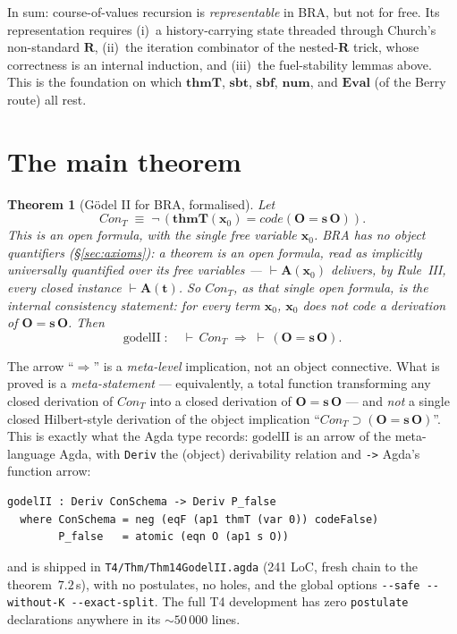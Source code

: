 \documentclass[11pt]{article}
\theoremstyle{plain}
\newtheorem{theorem}{Theorem}[section]
\theoremstyle{definition}
\theoremstyle{remark}
\newcommand{\code}[1]{\mathit{code}(#1)}
\newcommand{\sbf}{\mathbf{sbf}}
\newcommand{\sbt}{\mathbf{sbt}}
\newcommand{\thmT}{\mathbf{thmT}}
\newcommand{\num}{\mathbf{num}}
\newcommand{\Con}{\mathit{Con}}
\begin{document}
In sum: course-of-values recursion is \emph{representable} in BRA, but not
for free.  Its representation requires (i)~a history-carrying state threaded
through Church's non-standard $\mathbf{R}$, (ii)~the iteration combinator of
the nested-$\mathbf{R}$ trick, whose correctness is an internal induction,
and (iii)~the fuel-stability lemmas above.  This is the foundation on which
$\thmT$, $\sbt$, $\sbf$, $\num$, and $\mathbf{Eval}$ (of the Berry route)
all rest.

\section{The main theorem}

\begin{theorem}[G\"odel II for BRA, formalised]
\label{thm:godelII}
Let
\[
\Con_T \;\equiv\; \neg\,(\thmT(\mathbf{x}_0) = \code{\mathbf{O} = \mathbf{s}\,\mathbf{O}}).
\]
This is an \emph{open} formula, with the single free variable
$\mathbf{x}_0$.  BRA has no object quantifiers ({\S}\ref{sec:axioms}): a
theorem is an open formula, read as \emph{implicitly universally
quantified} over its free variables --- $\vdash\mathbf{A}(\mathbf{x}_0)$
delivers, by Rule~III, every closed instance $\vdash\mathbf{A}(\mathbf{t})$.
So $\Con_T$, as that single open formula, \emph{is} the internal
consistency statement: \emph{for every} term $\mathbf{x}_0$, $\mathbf{x}_0$
does not code a derivation of $\mathbf{O} = \mathbf{s}\,\mathbf{O}$.  Then
\[
\mathrm{godelII} \;:\quad {\vdash}\,\Con_T \;\Longrightarrow\; {\vdash}\,(\mathbf{O} = \mathbf{s}\,\mathbf{O}).
\]
\end{theorem}

\noindent
The arrow ``$\Longrightarrow$'' is a \emph{meta-level} implication, not an
object connective.  What is proved is a \emph{meta-statement} ---
equivalently, a total function transforming any closed derivation of
$\Con_T$ into a closed derivation of $\mathbf{O} = \mathbf{s}\,\mathbf{O}$
--- and \emph{not} a single closed Hilbert-style derivation of the object
implication ``$\Con_T \supset (\mathbf{O} = \mathbf{s}\,\mathbf{O})$''.
This is exactly what the Agda type records: $\mathrm{godelII}$ is an arrow
of the meta-language Agda, with \texttt{Deriv} the (object) derivability
relation and \verb|->| Agda's function arrow:
\begin{lstlisting}
godelII : Deriv ConSchema -> Deriv P_false
  where ConSchema = neg (eqF (ap1 thmT (var 0)) codeFalse)
        P_false   = atomic (eqn O (ap1 s O))
\end{lstlisting}
and is shipped in \verb|T4/Thm/Thm14GodelII.agda| (241 LoC, fresh
chain to the theorem~$7.2$\,s), with no postulates, no holes, and the
global options \verb|--safe --without-K --exact-split|.  The full T4
development has zero \verb|postulate| declarations anywhere in its
$\sim 50\,000$ lines.
\end{document}
